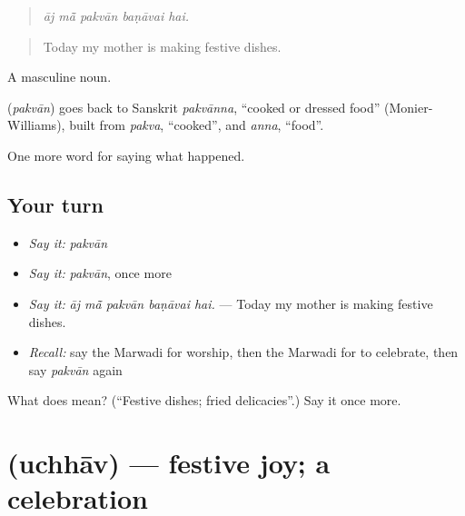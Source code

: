 \begin{quote}
    
\end{quote}

\begin{quote}
\emph{āj mā̃ pakvān baṇāvai hai.}
\end{quote}

\begin{quote}
Today my mother is making festive dishes.
\end{quote}

A masculine noun.

\begin{cousinweb}
\textbf{} (\emph{pakvān}) goes back to Sanskrit \emph{pakvānna}, \textquotedblleft{}cooked or dressed food\textquotedblright{} (Monier-Williams), built from \emph{pakva}, \textquotedblleft{}cooked\textquotedblright{}, and \emph{anna}, \textquotedblleft{}food\textquotedblright{}.
\end{cousinweb}

\begin{grammarlens}[title={What you've built}]
One more word for saying what happened.
\end{grammarlens}

\subsection*{Your turn}
\begin{itemize}
\raggedright
  \item \emph{Say it:} \emph{pakvān}
  \item \emph{Say it:} \emph{pakvān}, once more
  \item \emph{Say it:} \emph{āj mā̃ pakvān baṇāvai hai.} — Today my mother is making festive dishes.
  \item \emph{Recall:} say the Marwadi for worship, then the Marwadi for to celebrate, then say \emph{pakvān} again
\end{itemize}

\begin{tcolorbox}[breakable,colback=teal!4,colframe=teal!35!black,title={Before you move on}]
What does  mean? (\textquotedblleft{}Festive dishes; fried delicacies\textquotedblright{}.) Say it once more.
\end{tcolorbox}
\section[\texorpdfstring{\mw{उछाव} (uchhāv)}{उछाव (uchhāv)}]{ (uchhāv) — festive joy; a celebration}

